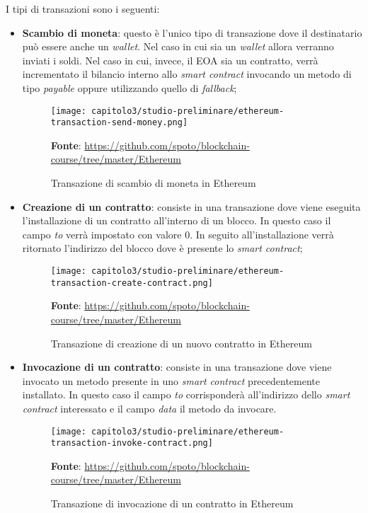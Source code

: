 \noindent I tipi di transazioni sono i seguenti:
\begin{itemize}
  \item \textbf{Scambio di moneta}: questo è l'unico tipo di transazione dove il destinatario può essere anche un \textit{wallet}. Nel caso in cui sia un \textit{wallet} allora verranno inviati i soldi. Nel caso in cui, invece, il EOA sia un contratto, verrà incrementato il bilancio interno allo \textit{smart contract} invocando un metodo di tipo \textit{payable} oppure utilizzando quello di \textit{fallback};
  
  \begin{figure}[h!]
    \centering
    \texttt{[image: capitolo3/studio-preliminare/ethereum-transaction-send-money.png]}
    \caption{Transazione di scambio di moneta in Ethereum}
    \textbf{Fonte}: \href{https://github.com/spoto/blockchain-course/tree/master/Ethereum}{https://github.com/spoto/blockchain-course/tree/master/Ethereum} 
  \end{figure}

  \item \textbf{Creazione di un contratto}: consiste in una transazione dove viene eseguita l'installazione di un contratto all'interno di un blocco. In questo caso il campo \textit{to} verrà impostato con valore 0. In seguito all'installazione verrà ritornato l'indirizzo del blocco dove è presente lo \textit{smart contract};
  
  \begin{figure}[h!]
    \centering
    \texttt{[image: capitolo3/studio-preliminare/ethereum-transaction-create-contract.png]}
    \caption{Transazione di creazione di un nuovo contratto in Ethereum}
    \textbf{Fonte}: \href{https://github.com/spoto/blockchain-course/tree/master/Ethereum}{https://github.com/spoto/blockchain-course/tree/master/Ethereum} 
  \end{figure}
  
  \item \textbf{Invocazione di un contratto}: consiste in una transazione dove viene invocato un metodo presente in uno \textit{smart contract} precedentemente installato. In questo caso il campo \textit{to} corrisponderà all'indirizzo dello \textit{smart contract} interessato e il campo \textit{data} il metodo da invocare.
  
  \begin{figure}[h!]
    \centering
    \texttt{[image: capitolo3/studio-preliminare/ethereum-transaction-invoke-contract.png]}
    \caption{Transazione di invocazione di un contratto in Ethereum}
    \textbf{Fonte}: \href{https://github.com/spoto/blockchain-course/tree/master/Ethereum}{https://github.com/spoto/blockchain-course/tree/master/Ethereum} 
  \end{figure}
\end{itemize}


